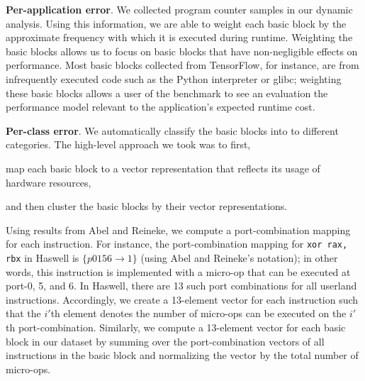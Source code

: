 \textbf{Per-application error}.
We collected program counter samples
in our dynamic analysis.
Using this information, we are able to weight each basic block by
the approximate frequency with which it is executed during runtime.
Weighting the basic blocks allows us to focus on basic blocks that have
non-negligible effects on performance.
Most basic blocks collected from TensorFlow\cite{tensorflow},
for instance, are from infrequently executed code 
such as the Python interpreter or glibc;
weighting these basic blocks allows a user of the benchmark
to see an evaluation the performance model relevant
to the application's expected runtime cost.

\textbf{Per-class error}. 
We automatically classify the basic blocks into
to different categories.
The high-level approach we took was to first,
\begin{enumerate*}
\item map each basic block to a vector representation
that reflects its usage of hardware resources,
\item and then cluster the basic blocks by their vector representations.
\end{enumerate*}

Using results from Abel and Reineke\cite{uops},
we compute a port-combination mapping for each instruction.
For instance,
the port-combination mapping for \verb|xor rax, rbx| in Haswell
is $\{ p0156 \rightarrow 1 \}$ (using Abel and Reineke's notation);
in other words, this instruction is implemented 
with a micro-op that can be executed at port-0, 5, and 6.
In Haswell, there are 13 such port combinations for all userland instructions.
Accordingly, we create a 13-element vector for each instruction such that
the $i'$th element denotes the number of micro-ops can be executed
on the $i'$th port-combination.
Similarly, we compute a 13-element vector for each basic block
in our dataset by summing over the port-combination vectors
of all instructions in the basic block and normalizing the vector by 
the total number of micro-ops.

